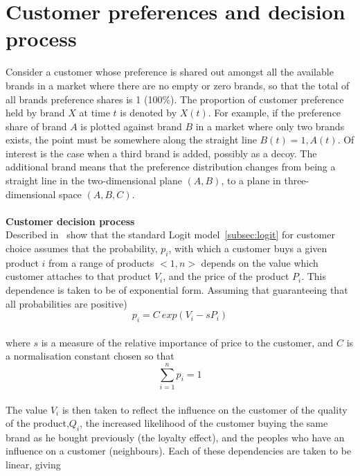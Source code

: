\section{Customer preferences and decision process} \label{sec:customer_preferences}
Consider a customer whose preference is shared out amongst all the available brands in a market where there are
no empty or zero brands, so that the total of all brands preference shares is 1 (100\%).
The proportion of customer preference held by brand $X$ at time $t$ is denoted by $X(t)$.
For example, if the preference share of brand $A$ is plotted against brand $B$ in a market where only two brands exists,
the point must be somewhere along the straight line $B(t) = 1, A(t)$.
Of interest is the case when a third brand is added, possibly as a decoy.
The additional brand means that the preference distribution changes from being a straight line in the two-dimensional plane $(A, B)$,
to a plane in three-dimensional space $(A,B,C)$.\\
\\
\textbf{Customer decision process} \label{sec:cus_decision}\\
Described in~\cite{patel} show that the standard Logit model~\ref{subsec:logit} for customer choice assumes that
the probability, $p_i$, with which a customer buys a given product $i$ from a range of products $<1, n>$ depends on
the value which customer attaches to that product $V_i$, and the price of the product $P_i$.
This dependence is taken to be of exponential form.
Assuming that guaranteeing that all probabilities are positive)
\\
\begin{equation} \label{eq:7}
p_i = C~exp(V_i - sP_i)
\end{equation}
\\
where $s$ is a measure of the relative importance of price to the customer, and $C$ is a normalisation constant chosen so that~\cite{patel}
\\
\begin{equation} \label{eq:8}
\sum_{i=1}^n p_i = 1
\end{equation}
\\
The value $V_i$ is then taken to reflect the influence on the customer of the quality of the product,$Q_i$,
the increased likelihood of the customer buying the same brand as he bought previously (the loyalty effect),
and the peoples who have an influence on a customer (neighbours).
Each of these dependencies are taken to be linear, giving~\cite{patel}
\\
